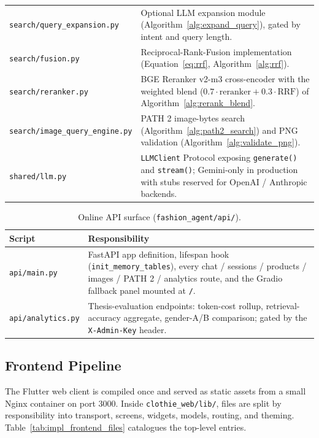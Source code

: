 \begin{table}[H]
\begin{tabular}{p{6.0cm} p{8.6cm}}
\texttt{search/query\_expansion.py} & Optional LLM expansion module (Algorithm~\ref{alg:expand_query}), gated by intent and query length. \\
\texttt{search/fusion.py} & Reciprocal-Rank-Fusion implementation (Equation~\ref{eq:rrf}, Algorithm~\ref{alg:rrf}). \\
\texttt{search/reranker.py} & BGE Reranker v2-m3 cross-encoder with the weighted blend ($0.7 \cdot \text{reranker} + 0.3 \cdot \text{RRF}$) of Algorithm~\ref{alg:rerank_blend}. \\
\texttt{search/image\_query\_engine.py} & PATH 2 image-bytes search (Algorithm~\ref{alg:path2_search}) and PNG validation (Algorithm~\ref{alg:validate_png}). \\
\texttt{shared/llm.py} & \texttt{LLMClient} Protocol exposing \texttt{generate()} and \texttt{stream()}; Gemini-only in production with stubs reserved for OpenAI / Anthropic backends. \\
\bottomrule
\end{tabular}
\end{table}

\begin{table}[H]
\centering
\caption{Online API surface (\texttt{fashion\_agent/api/}).}
\label{tab:impl_online_api_scripts}
\small
\begin{tabular}{p{6.0cm} p{8.6cm}}
\toprule
\textbf{Script} & \textbf{Responsibility} \\
\midrule
\texttt{api/main.py} & FastAPI app definition, lifespan hook (\texttt{init\_memory\_tables}), every chat / sessions / products / images / PATH 2 / analytics route, and the Gradio fallback panel mounted at \texttt{/}. \\
\texttt{api/analytics.py} & Thesis-evaluation endpoints: token-cost rollup, retrieval-accuracy aggregate, gender-A/B comparison; gated by the \texttt{X-Admin-Key} header. \\
\bottomrule
\end{tabular}
\end{table}

\subsection{Frontend Pipeline}

The Flutter web client is compiled once and served as static assets from a small Nginx container on port 3000. Inside \texttt{clothie\_web/lib/}, files are split by responsibility into transport, screens, widgets, models, routing, and theming. Table~\ref{tab:impl_frontend_files} catalogues the top-level entries.

